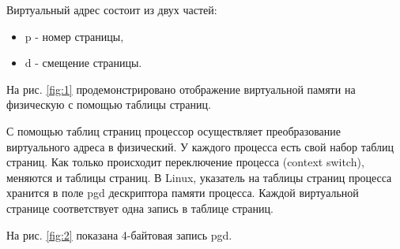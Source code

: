 Виртуальный адрес состоит из двух частей:

\begin{itemize}
	\item p - номер страницы,
	\item d - смещение страницы.
\end{itemize}

На рис. \ref{fig:1} продемонстрировано отображение виртуальной памяти на физическую с помощью таблицы страниц.

\begin{figure}[ht!]
\end{figure}

\newpage


С помощью таблиц страниц процессор осуществляет 
преобразование виртуального адреса в физический. 
У каждого процесса есть свой набор таблиц страниц.
Как только происходит переключение процесса (context switch), меняются и таблицы страниц. 
В Linux, указатель на таблицы страниц процесса хранится в поле pgd дескриптора памяти процесса. 
Каждой виртуальной странице соответствует одна запись в таблице страниц.

На рис. \ref{fig:2} показана 4-байтовая запись pgd.

\begin{figure}[ht!]
\end{figure}

